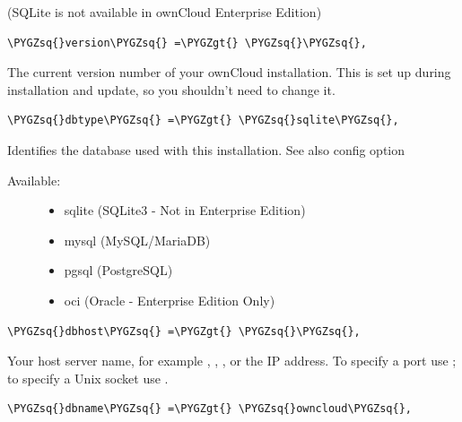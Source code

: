 \documentclass[letterpaper,10pt,english]{sphinxmanual}
\def\PYGZgt{\char`\>}
\def\PYGZsq{\char`\'}
\begin{document}
(SQLite is not available in ownCloud Enterprise Edition)

\begin{Verbatim}[commandchars=\\\{\}]
\PYGZsq{}version\PYGZsq{} =\PYGZgt{} \PYGZsq{}\PYGZsq{},
\end{Verbatim}

The current version number of your ownCloud installation. This is set up
during installation and update, so you shouldn't need to change it.

\begin{Verbatim}[commandchars=\\\{\}]
\PYGZsq{}dbtype\PYGZsq{} =\PYGZgt{} \PYGZsq{}sqlite\PYGZsq{},
\end{Verbatim}

Identifies the database used with this installation. See also config option
\begin{description}
\item[{Available:}] \leavevmode\begin{itemize}
\item {} 
sqlite (SQLite3 - Not in Enterprise Edition)

\item {} 
mysql (MySQL/MariaDB)

\item {} 
pgsql (PostgreSQL)

\item {} 
oci (Oracle - Enterprise Edition Only)

\end{itemize}

\end{description}

\begin{Verbatim}[commandchars=\\\{\}]
\PYGZsq{}dbhost\PYGZsq{} =\PYGZgt{} \PYGZsq{}\PYGZsq{},
\end{Verbatim}

Your host server name, for example , ,
, or the IP address. To specify a port use
; to specify a Unix socket use
.

\begin{Verbatim}[commandchars=\\\{\}]
\PYGZsq{}dbname\PYGZsq{} =\PYGZgt{} \PYGZsq{}owncloud\PYGZsq{},
\end{Verbatim}
\end{document}
